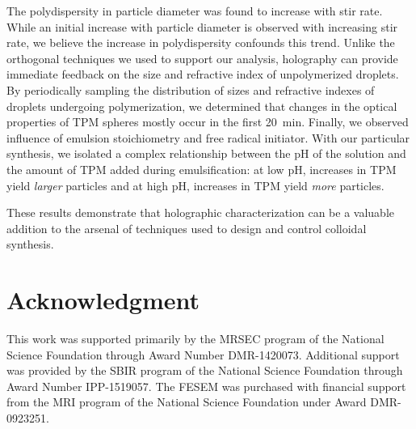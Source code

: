 The polydispersity in particle diameter was found to increase
with stir rate. While an initial increase with particle diameter is observed with increasing
stir rate, we believe the increase in polydispersity confounds this trend.
Unlike the orthogonal techniques we used to support our analysis,
holography can provide immediate feedback on the size and refractive index of unpolymerized
droplets. By periodically sampling the distribution of sizes and refractive indexes of
droplets undergoing polymerization, we determined that changes in the optical properties
of TPM spheres mostly occur in the first \SI{20}{\minute}. Finally, we observed
influence of emulsion stoichiometry and free radical initiator.
With our particular synthesis, we isolated a complex
relationship between the pH of the solution and the amount of TPM added
during emulsification: at low pH, increases in TPM yield \emph{larger}
particles and at high pH, increases in TPM yield \emph{more} particles.


These results demonstrate that holographic characterization can be a valuable
addition to the arsenal of techniques used to design and control colloidal
synthesis.

\section{Acknowledgment}

This work was supported primarily by the MRSEC program of
the National Science Foundation through Award Number DMR-1420073.
Additional support was provided by the SBIR program of the
National Science Foundation through Award Number IPP-1519057.
The FESEM was purchased with financial support from the MRI program
of the National Science Foundation under Award DMR-0923251.
